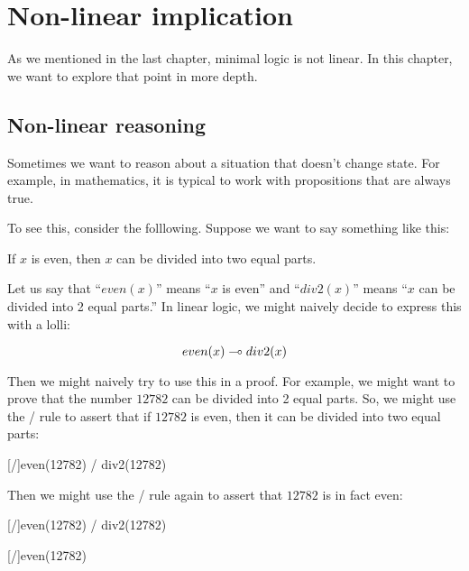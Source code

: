 \documentclass[../../../main.tex]{subfiles}
\begin{document}
\chapter{Non-linear implication}

As we mentioned in the last chapter, minimal logic is not linear. In this chapter, we want to explore that point in more depth.


\section{Non-linear reasoning}

Sometimes we want to reason about a situation that doesn't change state. For example, in mathematics, it is typical to work with propositions that are always true.

To see this, consider the folllowing. Suppose we want to say something like this:

\begin{center}
  If $x$ is even, then $x$ can be divided into two equal parts.
\end{center}

\noindent
Let us say that ``$even(x)$'' means ``$x$ is even'' and ``$div2(x)$'' means ``$x$ can be divided into 2 equal parts.'' In linear logic, we might naively decide to express this with a lolli:

\begin{equation*}
  even(x) \lolli/ div2(x)
\end{equation*}

\noindent
Then we might naively try to use this in a proof. For example, we might want to prove that the number $12782$ can be divided into 2 equal parts. So, we might use the \startrule/ rule to assert that if $12782$ is even, then it can be divided into two equal parts:

\begin{prooftree*}
  \hypo{}
  [\startrule/]{even(12782) \lolli/ div2(12782)}
\end{prooftree*}

\noindent
Then we might use the \startrule/ rule again to assert that $12782$ is in fact even:

\begin{prooftree*}
  \hypo{}
  [\startrule/]{even(12782) \lolli/ div2(12782)}
  
  \hypo{}
  [\startrule/]{even(12782)}
  
\end{prooftree*}
\end{document}
